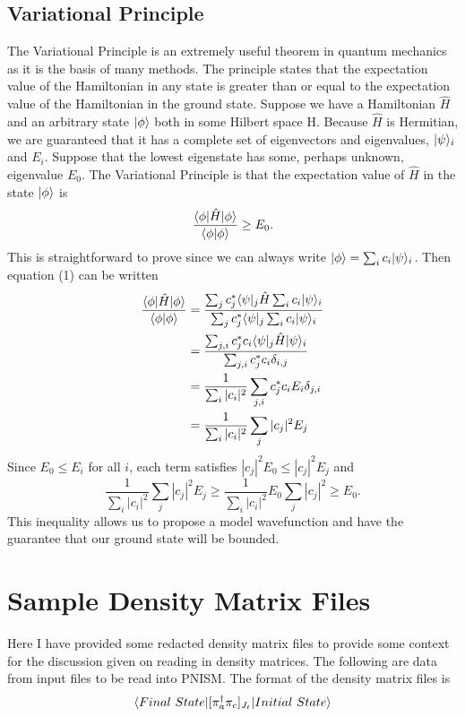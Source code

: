 \section{Variational Principle}
\label{VP}
The Variational Principle is an extremely useful theorem in quantum mechanics as it
is the basis of many methods. 
The principle states that the expectation value of the Hamiltonian in any state is
greater than or equal to the expectation value of the Hamiltonian in the ground
state. Suppose we have a Hamiltonian $\hat{H}$ and an arbitrary state $|\phi\rangle$
both in some Hilbert space H. Because $\hat{H}$ is Hermitian, we are guaranteed
that it has a complete set of eigenvectors and eigenvalues, ${|\psi\rangle_i}$ and 
${E_i}$. Suppose that the lowest eigenstate has some, perhaps unknown, 
eigenvalue $E_0$. The Variational Principle is that the expectation value of 
$\hat{H}$ in the state $|\phi\rangle$ is
\begin{equation}
    \frac{\langle \phi|\hat{H}|\phi\rangle}{\langle \phi|\phi\rangle} \geq E_0.
\end{equation}
This is straightforward to prove since we can always write $|\phi\rangle = \sum_ic_i|\psi\rangle_i$.
Then equation (1) can be written
\begin{equation}\begin{split}
    \frac{\langle \phi|\hat{H}|\phi\rangle}{\langle \phi|\phi\rangle} &= 
    \frac{\sum_jc^*_j\langle \psi|_j\hat{H}\sum_ic_i|\psi\rangle_i}{\sum_jc^*_j\langle \psi|_j\sum_ic_i|\psi\rangle_i} \\
    &= \frac{\sum_{j,i}c^*_jc_i\langle \psi|_j\hat{H}|\psi\rangle_i}{\sum_{j,i}c^*_jc_i\delta_{i,j}} \\
    &= \frac{1}{\sum_{i}|c_i|^2}\sum_{j,i}c^*_jc_iE_i\delta_{j,i} \\
    &= \frac{1}{\sum_{i}|c_i|^2}\sum_{j}|c_j|^2E_j
\end{split}\end{equation}
Since $E_0\leq E_i$ for all $i$, each term satisfies $|c_j|^2E_0\leq|c_j|^2E_j$ and
\begin{equation}
    \frac{1}{\sum_{i}|c_i|^2}\sum_{j}|c_j|^2E_j \geq \frac{1}{\sum_{i}|c_i|^2}E_0\sum_{j}|c_j|^2 \geq E_0.
\end{equation}
This inequality allows us to propose a model wavefunction and have the guarantee 
that our ground state will be bounded.




\chapter{Sample Density Matrix Files}
Here I have provided some redacted density matrix files to provide some context
for the discussion given on reading in density matrices. The following are data
from input files to be read into PNISM. The format of the density matrix files is
\begin{equation}
    \langle Final\ State|[\pi^\dagger_a \pi_c]_{J_t}|Initial\ State\rangle
\end{equation}

